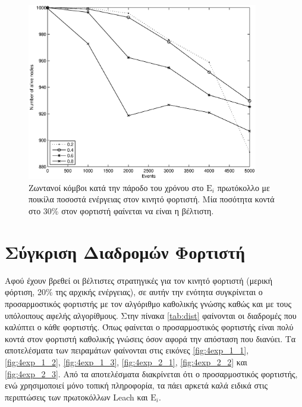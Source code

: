 \begin{figure}[H]
  \centering
   \includegraphics[width=0.9\textwidth]{experiments/classic/3.smallVSbigpercentage/alive_nodes_ei_rc_per_our.eps}
  \caption{Ζωντανοί κόμβοι κατά την πάροδο του χρόνου στο $\text{E}_{i}$ πρωτόκολλο με ποικίλα ποσοστά ενέργειας στον κινητό φορτιστή. Μία ποσότητα κοντά στο 30\%
στον φορτιστή φαίνεται να είναι η βέλτιστη.}
  \label{fig:3exp_1_3}
\end{figure}


\section{Σύγκριση Διαδρομών Φορτιστή}\label{sc:result4}
Αφού έχουν βρεθεί οι βέλτιστες στρατηγικές για τον κινητό φορτιστή (μερική φόρτιση, 20\% της αρχικής ενέργειας), σε αυτήν την ενότητα συγκρίνεται ο προσαρμοστικός
φορτιστής με τον αλγόριθμο καθολικής γνώσης καθώς και με τους υπόλοιπους αφελής αλγορίθμους. Στην πίνακα \ref{tab:dist} φαίνονται οι διαδρομές που καλύπτει ο κάθε
φορτιστής. Όπως φαίνεται ο προσαρμοστικός φορτιστής είναι πολύ κοντά στον φορτιστή καθολικής γνώσεις όσον αφορά την απόσταση που διανύει. Τα αποτελέσματα των
πειραμάτων φαίνονται στις εικόνες \ref{fig:4exp_1_1}, \ref{fig:4exp_1_2}, \ref{fig:4exp_1_3}, \ref{fig:4exp_2_1}, \ref{fig:4exp_2_2} και \ref{fig:4exp_2_3}. Από τα
αποτελέσματα διακρίνεται ότι ο προσαρμοστικός φορτιστής, ενώ χρησιμοποιεί μόνο τοπική πληροφορία, τα πάει αρκετά καλά ειδικά στις περιπτώσεις των πρωτοκόλλων Leach
και $\text{E}_{i}$.

